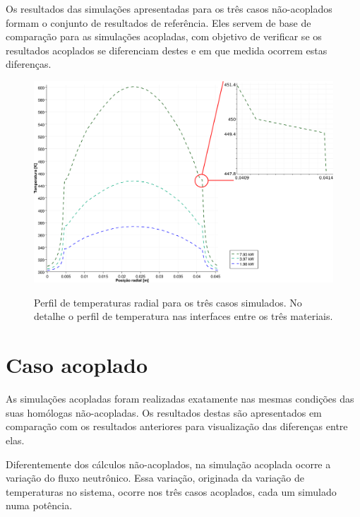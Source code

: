 Os resultados das simulações apresentadas para os três casos não-acoplados formam o conjunto de resultados
de referência. Eles servem de base de comparação para as simulações acopladas, com objetivo de verificar
se os resultados acoplados se diferenciam destes e em que medida ocorrem estas diferenças.

\begin{figure}[htb]
  \caption[Perfil de temperaturas radial para os três casos simulados.]
          {Perfil de temperaturas radial para os três casos simulados. No detalhe o perfil de temperatura nas interfaces entre os três materiais.}
  \centering\includegraphics[scale=0.5]{figuras/T_x_NC_square_port_detalhado.png}
  \label{fig:perf-t-nac-radial}
\end{figure}


\section{Caso acoplado}
\label{sec:cp}

As simulações acopladas foram realizadas exatamente nas mesmas condições das suas homólogas não-acopladas.
Os resultados destas são apresentados em comparação com os resultados anteriores para visualização
das diferenças entre elas.

Diferentemente dos cálculos não-acoplados, na simulação acoplada ocorre a variação do fluxo neutrônico.
Essa variação, originada da variação de temperaturas no sistema, ocorre nos três casos acoplados, cada
um simulado numa potência.

